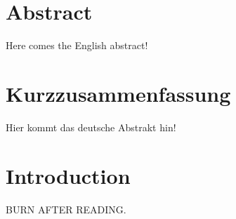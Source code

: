\documentclass[12pt,a4paper]{article}
\begin{document}


\newpage

\tableofcontents
\listoffigures
\listoftables

\newpage


\section{Abstract}
Here comes the English abstract!

\vfill %

\section*{Kurzzusammenfassung} %

Hier kommt das deutsche Abstrakt hin!

\newpage


\section{Introduction}
BURN AFTER READING. 
\end{document}

